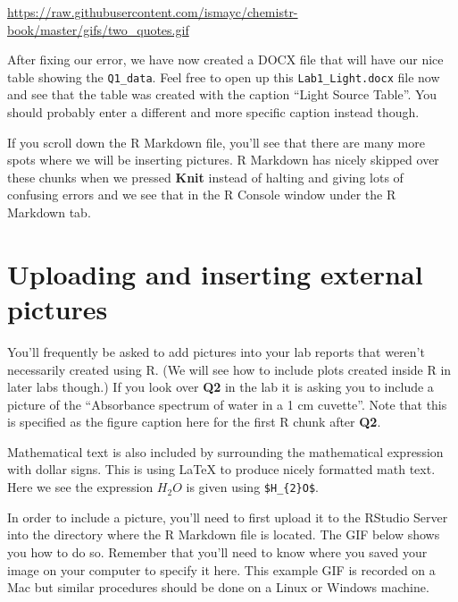 \documentclass[]{tufte-book}
\begin{document}
\vspace{0.1in}

\begin{center}\footnotesize{\url{https://raw.githubusercontent.com/ismayc/chemistr-book/master/gifs/two_quotes.gif}}\end{center}

\vspace{0.1in}

After fixing our error, we have now created a DOCX file that will have
our nice table showing the \texttt{Q1\_data}. Feel free to open up this
\texttt{Lab1\_Light.docx} file now and see that the table was created
with the caption ``Light Source Table''. You should probably enter a
different and more specific caption instead though.

If you scroll down the R Markdown file, you'll see that there are many
more spots where we will be inserting pictures. R Markdown has nicely
skipped over these chunks when we pressed \textbf{Knit} instead of
halting and giving lots of confusing errors and we see that in the R
Console window under the R Markdown tab.

\section{Uploading and inserting external
pictures}\label{uploading-and-inserting-external-pictures}

You'll frequently be asked to add pictures into your lab reports that
weren't necessarily created using R. (We will see how to include plots
created inside R in later labs though.) If you look over \textbf{Q2} in
the lab it is asking you to include a picture of the ``Absorbance
spectrum of water in a 1 cm cuvette''. Note that this is specified as
the figure caption here for the first R chunk after \textbf{Q2}.

Mathematical text is also included by surrounding the mathematical
expression with dollar signs. This is using LaTeX to produce nicely
formatted math text. Here we see the expression \(H_{2}O\) is given
using \texttt{\$H\_\{2\}O\$}.

In order to include a picture, you'll need to first upload it to the
RStudio Server into the directory where the R Markdown file is located.
The GIF below shows you how to do so. Remember that you'll need to know
where you saved your image on your computer to specify it here. This
example GIF is recorded on a Mac but similar procedures should be done
on a Linux or Windows machine.
\end{document}
